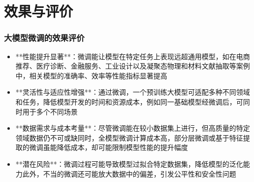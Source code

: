 \section{效果与评价}
\begin{frame}
    \frametitle{大模型微调的效果评价}
    \begin{itemize}
        \item **性能提升显著**：微调能让模型在特定任务上表现远超通用模型，如在电商推荐、医疗诊断、金融服务、工业设计以及凝聚态物理和材料文献抽取等案例中，相关模型的准确率、效率等性能指标显著提高
        \item **灵活性与适应性增强**：通过微调，一个预训练大模型可适配多种不同领域和任务，降低模型开发的时间和资源成本，例如同一基础模型经微调后，可同时用于多个不同场景
        \item **数据需求与成本考量**：尽管微调能在较小数据集上进行，但高质量的特定领域数据仍不可或缺同时，全模型微调计算成本高，部分层微调或基于特征提取的微调虽能降低成本，却可能限制模型性能的提升幅度
        \item **潜在风险**：微调过程可能导致模型过拟合特定数据集，降低模型的泛化能力此外，不当的微调还可能放大数据中的偏差，引发公平性和安全性问题
    \end{itemize}
\end{frame}


